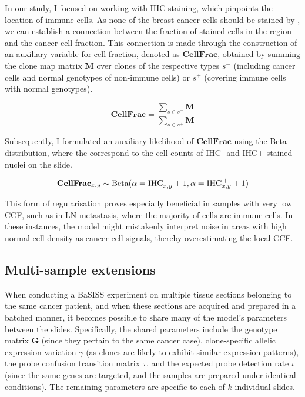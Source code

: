 In our study, I focused on working with  \ac{IHC} staining, which pinpoints the location of immune cells. As none of the breast cancer cells should be stained by , we can establish a connection between the fraction of stained cells in the region and the cancer cell fraction. This connection is made through the construction of an auxiliary variable for cell fraction, denoted as $\mathbf{CellFrac}$, obtained by summing the clone map matrix $\mathbf{M}$ over clones of the respective types $s^-$ (including cancer cells and normal genotypes of non-immune cells) or $s^+$ (covering immune cells with normal genotypes).

\begin{equation} 
\mathbf{CellFrac} = \dfrac{\sum_{s \in s^-} \mathbf{M}}{\sum_{s \in s^+} \mathbf{M}}
\end{equation}

Subsequently, I formulated an auxiliary likelihood of $\mathbf{CellFrac}$ using the Beta distribution, where the  correspond to the cell counts of \ac{IHC}- and \ac{IHC}+ stained nuclei on the slide.

\begin{equation} 
\mathbf{CellFrac}_{x,y} \sim \mathrm{Beta}(\alpha=\text{IHC}^\text{\,-}_{x,y} + 1, \alpha=\text{IHC}^\text{\,+}_{x,y} + 1)
\end{equation}

This form of regularisation proves especially beneficial in samples with very low \acl{CCF}, such as in \acl{LN} metastasis, where the majority of cells are immune cells. In these instances, the model might mistakenly interpret noise in areas with high normal cell density as cancer cell signals, thereby overestimating the local \ac{CCF}.

\subsection{Multi-sample extensions}
When conducting a BaSISS experiment on multiple tissue sections belonging to the same cancer patient, and when these sections are acquired and prepared in a batched manner, it becomes possible to share many of the model's parameters between the slides. Specifically, the shared parameters include the genotype matrix $\mathbf{G}$ (since they pertain to the same cancer case), clone-specific allelic expression variation $\gamma$ (as clones are likely to exhibit similar expression patterns), the probe confusion transition matrix $\tau$, and the expected probe detection rate $\iota$ (since the same genes are targeted, and the samples are prepared under identical conditions). The remaining parameters are specific to each of $k$ individual slides.

